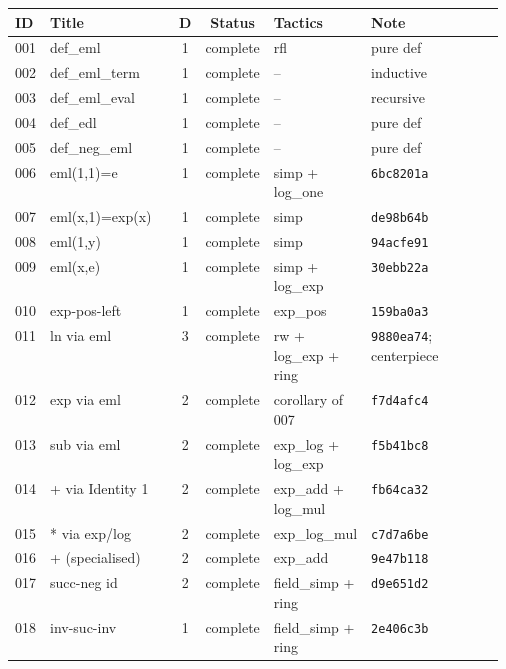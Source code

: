 \documentclass[11pt,a4paper]{article}
\theoremstyle{plain}
\theoremstyle{definition}
\begin{document}
\renewcommand{\arraystretch}{1.05}
{\footnotesize
\begin{longtable}{@{}lp{0.27\linewidth}cclp{0.30\linewidth}@{}}
\toprule
\textbf{ID} & \textbf{Title} & \textbf{D} & \textbf{Status} & \textbf{Tactics} & \textbf{Note}\\
\midrule
\endhead
001 & def\_eml          & 1 & complete & rfl                       & pure def \\
002 & def\_eml\_term    & 1 & complete & --                        & inductive \\
003 & def\_eml\_eval    & 1 & complete & --                        & recursive \\
004 & def\_edl          & 1 & complete & --                        & pure def \\
005 & def\_neg\_eml     & 1 & complete & --                        & pure def \\
006 & eml(1,1)=e        & 1 & complete & simp + log\_one           & \texttt{6bc8201a} \\
007 & eml(x,1)=exp(x)   & 1 & complete & simp                      & \texttt{de98b64b} \\
008 & eml(1,y)          & 1 & complete & simp                      & \texttt{94acfe91} \\
009 & eml(x,e)          & 1 & complete & simp + log\_exp           & \texttt{30ebb22a} \\
010 & exp-pos-left      & 1 & complete & exp\_pos                  & \texttt{159ba0a3} \\
011 & ln via eml        & 3 & complete & rw + log\_exp + ring      & \texttt{9880ea74}; centerpiece \\
012 & exp via eml       & 2 & complete & corollary of 007          & \texttt{f7d4afc4} \\
013 & sub via eml       & 2 & complete & exp\_log + log\_exp       & \texttt{f5b41bc8} \\
014 & + via Identity 1  & 2 & complete & exp\_add + log\_mul       & \texttt{fb64ca32} \\
015 & * via exp/log     & 2 & complete & exp\_log\_mul             & \texttt{c7d7a6be} \\
016 & + (specialised)   & 2 & complete & exp\_add                  & \texttt{9e47b118} \\
017 & succ-neg id       & 2 & complete & field\_simp + ring        & \texttt{d9e651d2} \\
018 & inv-suc-inv       & 1 & complete & field\_simp + ring        & \texttt{2e406c3b} \\

\end{longtable}}
\end{document}
